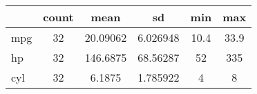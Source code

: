 {
\def\sym#1{\ifmmode^{#1}\else\(^{#1}\)\fi}
\begin{tabular}{l*{1}{ccccc}}
\hline\hline
            &       count&        mean&          sd&         min&         max\\
\hline
mpg         &          32&    20.09062&    6.026948&        10.4&        33.9\\
hp          &          32&    146.6875&    68.56287&          52&         335\\
cyl         &          32&      6.1875&    1.785922&           4&           8\\
\hline\hline
\end{tabular}
}
